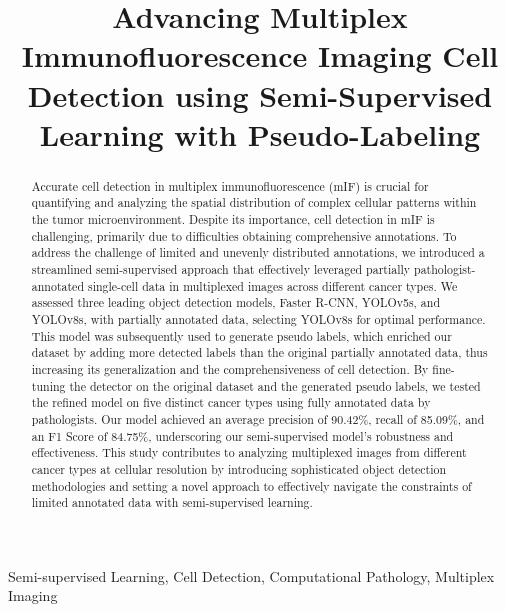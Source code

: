\documentclass{midl} %
\title[Semi-Supervised Cell Detection in Immunofluorescence Imaging]{Advancing Multiplex Immunofluorescence Imaging Cell Detection using Semi-Supervised Learning with Pseudo-Labeling}
\begin{document}
\maketitle

\begin{abstract}
Accurate cell detection in multiplex immunofluorescence (mIF) is crucial for quantifying and analyzing the spatial distribution of complex cellular patterns within the tumor microenvironment. Despite its importance, cell detection in mIF is challenging, primarily due to difficulties obtaining comprehensive annotations. To address the challenge of limited and unevenly distributed annotations, we introduced a streamlined semi-supervised approach that effectively leveraged partially pathologist-annotated single-cell data in multiplexed images across different cancer types. We assessed three leading object detection models, Faster R-CNN, YOLOv5s, and YOLOv8s, with partially annotated data, selecting YOLOv8s for optimal performance. This model was subsequently used to generate pseudo labels, which enriched our dataset by adding more detected labels than the original partially annotated data, thus increasing its generalization and the comprehensiveness of cell detection. By fine-tuning the detector on the original dataset and the generated pseudo labels, we tested the refined model on five distinct cancer types using fully annotated data by pathologists. Our model achieved an average precision of 90.42\%, recall of 85.09\%, and an F1 Score of 84.75\%, underscoring our semi-supervised model's robustness and effectiveness. This study contributes to analyzing multiplexed images from different cancer types at cellular resolution by introducing sophisticated object detection methodologies and setting a novel approach to effectively navigate the constraints of limited annotated data with semi-supervised learning.
\end{abstract}

\begin{keywords}
Semi-supervised Learning, Cell Detection, Computational Pathology, Multiplex Imaging
\end{keywords}
\end{document}
